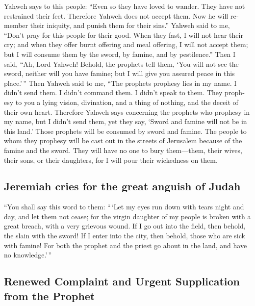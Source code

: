 \begin{paracol}{2}
\begin{otherlanguage}{english}
 Yahweh says to this people: ``Even so they have loved to
wander. They have not restrained their feet. Therefore Yahweh does not
accept them. Now he will remember their iniquity, and punish them for
their sins.''  Yahweh said to me, ``Don't pray for this
people for their good.  When they fast, I will not hear
their cry; and when they offer burnt offering and meal offering, I will
not accept them; but I will consume them by the sword, by famine, and by
pestilence.''  Then I said, ``Ah, Lord Yahweh! Behold,
the prophets tell them, `You will not see the sword, neither will you
have famine; but I will give you assured peace in this place.'\,''
 Then Yahweh said to me, ``The prophets prophesy lies in
my name. I didn't send them. I didn't command them. I didn't speak to
them. They prophesy to you a lying vision, divination, and a thing of
nothing, and the deceit of their own heart.  Therefore
Yahweh says concerning the prophets who prophesy in my name, but I
didn't send them, yet they say, `Sword and famine will not be in this
land.' Those prophets will be consumed by sword and famine.
 The people to whom they prophesy will be cast out in the
streets of Jerusalem because of the famine and the sword. They will have
no one to bury them---them, their wives, their sons, or their daughters,
for I will pour their wickedness on them.

\hypertarget{jeremiah-cries-for-the-great-anguish-of-judah}{%
\subsection{Jeremiah cries for the great anguish of
Judah}\label{jeremiah-cries-for-the-great-anguish-of-judah}}

 ``You shall say this word to them: ``\,`Let my eyes run
down with tears night and day, and let them not cease; for the virgin
daughter of my people is broken with a great breach, with a very
grievous wound.  If I go out into the field, then behold,
the slain with the sword! If I enter into the city, then behold, those
who are sick with famine! For both the prophet and the priest go about
in the land, and have no knowledge.'\,''

\hypertarget{renewed-complaint-and-urgent-supplication-from-the-prophet}{%
\subsection{Renewed Complaint and Urgent Supplication from the
Prophet}\label{renewed-complaint-and-urgent-supplication-from-the-prophet}}


\end{otherlanguage}
\end{paracol}
